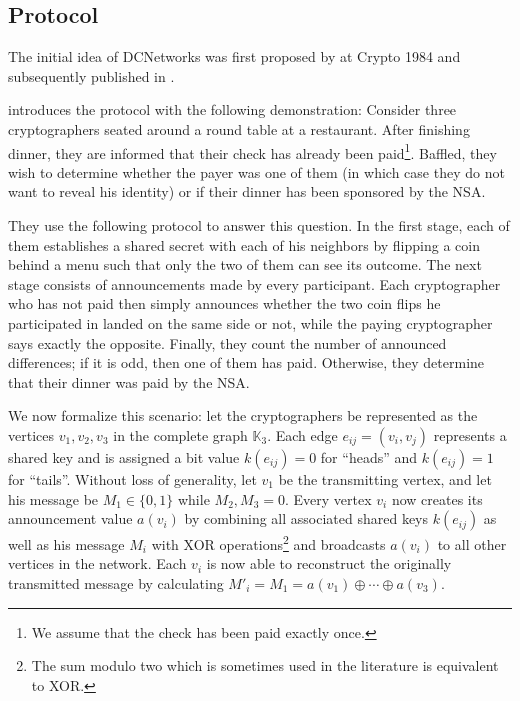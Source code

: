 
\subsection{Protocol}

The initial idea of \acp{DCNetwork} was first proposed by \citeauthor{journals/joc/Chaum88}
at Crypto 1984 and subsequently published in \citeyear{journals/joc/Chaum88} \cite{journals/joc/Chaum88}.

\citeauthor{journals/joc/Chaum88} introduces the protocol with the following demonstration:
Consider three cryptographers seated around a round table at a restaurant.
After finishing dinner, they are informed that their check has already been paid\footnote{
We assume that the check has been paid exactly once.}.
Baffled, they wish to determine whether the payer was one of them (in which case
they do not want to reveal his identity) or if their dinner has been sponsored by the NSA.

They use the following protocol to answer this question.
In the first stage, each of them establishes a shared secret with each of his neighbors by flipping
a coin behind a menu such that only the two of them can see its outcome. The next stage
consists of announcements made by every participant. Each cryptographer
who has not paid then simply announces whether the two coin flips he participated
in landed on the same side or not, while the paying cryptographer says exactly the opposite.
Finally, they count the number of announced differences; if it is odd, then one of them has paid.
Otherwise, they determine that their dinner was paid by the NSA.

We now formalize this scenario: let the cryptographers be represented as the vertices 
$v_1, v_2, v_3$ in the complete graph $\mathbb{K}_3$. Each edge $e_{ij} = (v_i, v_j)$ represents a shared
key and is assigned a bit value $k(e_{ij}) = 0$ for ``heads'' and $k(e_{ij}) = 1$ for ``tails''. Without loss of generality,
let $v_1$ be the transmitting vertex, and let his message be $M_1 \in \{0, 1\}$ while $M_2, M_3 = 0$.
Every vertex $v_i$ now creates its announcement value $a(v_i)$ by combining all associated shared keys $k(e_{ij})$
as well as his message $M_i$ with XOR operations\footnote{
The sum modulo two which is sometimes used in the literature is equivalent to XOR.}
and broadcasts $a(v_i)$ to all other vertices in the network. Each $v_i$ is now able to
reconstruct the originally transmitted message by calculating
$M'_i = M_1 = a(v_1) \oplus \cdots \oplus a(v_3)$.

